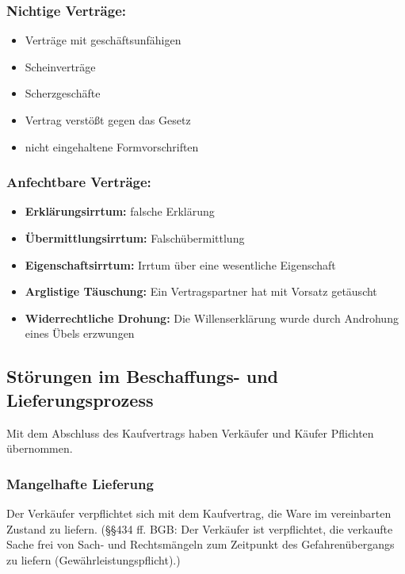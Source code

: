 \subsubsection{Nichtige Verträge:}

\begin{itemize}
	\item Verträge mit geschäftsunfähigen 
	\item Scheinverträge
	\item Scherzgeschäfte
	\item Vertrag verstößt gegen das Gesetz
	\item nicht eingehaltene Formvorschriften
\end{itemize}
	
\subsubsection{Anfechtbare Verträge:}

\begin{itemize}
	\item \textbf{Erklärungsirrtum:} falsche Erklärung
	\item \textbf{Übermittlungsirrtum:} Falschübermittlung
	\item \textbf{Eigenschaftsirrtum:} Irrtum über eine wesentliche Eigenschaft
	\item \textbf{Arglistige Täuschung:} Ein Vertragspartner hat mit Vorsatz getäuscht
	\item \textbf{Widerrechtliche Drohung:}\newline
	Die Willenserklärung wurde durch Androhung eines Übels erzwungen
\end{itemize}


\subsection{Störungen im Beschaffungs- und Lieferungsprozess}
Mit dem Abschluss des Kaufvertrags haben Verkäufer und Käufer Pflichten übernommen.

\subsubsection{Mangelhafte Lieferung}
Der Verkäufer verpflichtet sich mit dem Kaufvertrag, die Ware im vereinbarten Zustand zu liefern.  (§§434 ff. BGB: Der Verkäufer ist verpflichtet, die verkaufte Sache frei von Sach- und Rechtsmängeln zum Zeitpunkt des Gefahrenübergangs zu liefern (Gewährleistungspflicht).)

